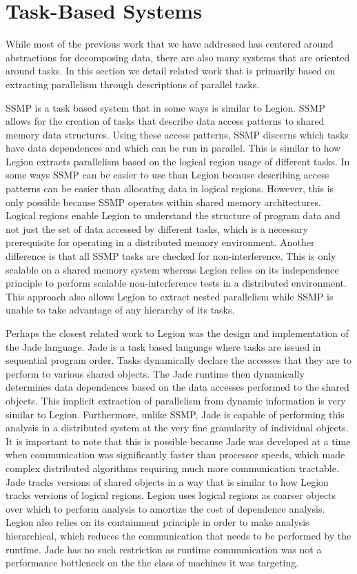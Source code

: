 \section{Task-Based Systems}
\label{sec:tasksys}

While most of the previous work that we have
addressed has centered around abstractions for
decomposing data, there are also many systems
that are oriented around tasks. In this
section we detail related work that is primarily
based on extracting parallelism through 
descriptions of parallel tasks.

SSMP\cite{SSMP10} is a task based system that
in some ways is similar to Legion. SSMP allows
for the creation of tasks that describe data
access patterns to shared memory data structures.
Using these access patterns, SSMP discerns which
tasks have data dependences and which can be
run in parallel. This is similar to how Legion
extracts parallelism based on the logical region
usage of different tasks. In some ways SSMP
can be easier to use than Legion because describing
access patterns can be easier than
allocating data in logical regions. However,
this is only possible because SSMP operates
within shared memory architectures. Logical regions
enable Legion to understand the structure of
program data and not just the set of data 
accessed by different tasks, which is a necessary
prerequisite for operating in a distributed
memory environment. Another difference is that
all SSMP tasks are checked for non-interference.
This is only scalable on a shared memory system
whereas Legion relies on its independence principle
to perform scalable non-interference tests in
a distributed environment. This approach also
allows Legion to extract nested parallelism while
SSMP is unable to take advantage of any 
hierarchy of its tasks.

Perhaps the closest related work to Legion 
was the design and implementation of the
Jade language\cite{Jade98}. Jade is a task based
language where tasks are issued in sequential
program order. Tasks dynamically declare the
accesses that they are to perform to various
shared objects. The Jade runtime then dynamically
determines data dependences based on the
data accesses performed to the shared objects.
This implicit extraction of parallelism from
dynamic information is very similar to Legion.
Furthermore, unlike SSMP, Jade is capable of
performing this analysis in a distributed 
system at the very fine granularity of individual
objects. It is important to note that this is
possible because Jade was developed at a time
when communication was significantly faster than
processor speeds, which made complex distributed
algorithms requiring much more communication
tractable. Jade tracks versions of shared objects
in a way that is similar to how Legion tracks
versions of logical regions. Legion uses logical
regions as coarser objects over which to perform
analysis to amortize the cost of dependence analysis.
Legion also relies on its containment principle
in order to make analysis hierarchical, which reduces
the communication that needs to be performed by
the runtime. Jade has no such restriction as
runtime communication was not a performance 
bottleneck on the the class of machines it was 
targeting.

